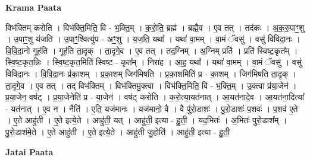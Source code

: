\documentclass[17pt]{extarticle}
\begin{document}
\textbf{Krama Paata} \newline

विभ॑क्तिम् करोति । विभ॑क्ति॒मिति॒ वि - भ॒क्ति॒म् । क॒रो॒ति॒ ब्रह्म॑ । ब्रह्मै॒व । ए॒व तत् । तद॑कः । अ॒क॒रु॒पाꣳ॒॒शु । उ॒पाꣳ॒॒शु य॑जति । उ॒पाꣳ॒॒श्वित्यु॑प - अꣳ॒॒शु । य॒ज॒ति॒ यथा᳚ । यथा॑ वा॒मम् । वा॒मं ॅवसु॑ । वसु॑ विविदा॒नः । वि॒वि॒दा॒नो गूह॑ति । गूह॑ति ता॒दृक् । ता॒दृगे॒व । ए॒व तत् । तद॒ग्निम् । अ॒ग्निम् प्रति॑ । प्रति॑ स्विष्ट॒कृत᳚म् । स्वि॒ष्ट॒कृत॒न्निः । स्वि॒ष्ट॒कृत॒मिति॑ स्विष्ट - कृत᳚म् । निरा॑ह । आ॒ह॒ यथा᳚ । यथा॑ वा॒मम् । वा॒मं ॅवसु॑ । वसु॑ विविदा॒नः । वि॒वि॒दा॒नः प्र॑का॒शम् । प्र॒का॒शम् जिग॑मिषति । प्र॒का॒शमिति॑ प्र - का॒शम् । जिग॑मिषति ता॒दृक् । ता॒दृगे॒व । ए॒व तत् । तद् विभ॑क्तिम् । विभ॑क्तिमु॒क्त्वा । विभ॑क्ति॒मिति॒ वि - भ॒क्ति॒म् । उ॒क्त्वा प्र॑या॒जेन॑ । प्र॒या॒जेन॒ वष॑ट् । प्र॒या॒जेनेति॑ प्र - या॒जेन॑ । वष॑ट् करोति । क॒रो॒त्या॒यत॑नात् । आ॒यत॑नादे॒व । आ॒यत॑ना॒दित्या᳚ - यत॑नात् । ए॒व न । नैति॑ । ए॒ति॒ यज॑मानः । यज॑मानो॒ वै । वै पु॑रो॒डाशः॑ । पु॒रो॒डाशः॑ प॒शवः॑ । प॒शव॑ ए॒ते । ए॒ते आहु॑ती । ए॒ते इत्ये॒ते । आहु॑ती॒ यत् । आहु॑ती॒ इत्या - हु॒ती॒ । यद॒भितः॑ । अ॒भितः॑ पुरो॒डाश᳚म् । पु॒रो॒डाश॑मे॒ते । ए॒ते आहु॑ती । ए॒ते इत्ये॒ते । आहु॑ती जु॒होति॑ । आहु॑ती॒ इत्या - हु॒ती॒ \newline

\textbf{Jatai Paata} \newline
\end{document}
